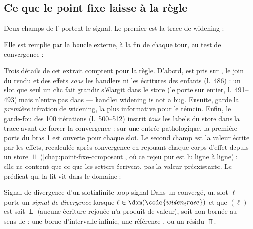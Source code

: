 \subsection{Ce que le point fixe laisse à la règle}
\label{sec:infinite-loop-signal}

Deux champs de l' portent le signal. Le premier est la trace de widening :


Elle est remplie par la boucle externe, à la fin de chaque tour, au test de convergence :


Trois détails de cet extrait comptent pour la règle. D'abord,  est pris sur , le join du rendu et des effets \emph{sans} les handlers ni les écritures des enfants (l.~486) : un slot que seul un clic fait grandir s'élargit dans le store (le  porte sur  entier, l.~491--493) mais n'entre pas dans  --- \og handler widening is not a bug\fg. Ensuite,  garde la \emph{première} itération de widening, la plus informative pour le témoin. Enfin, le garde-fou des 100 itérations (l.~500--512) inscrit \emph{tous} les labels du store dans la trace avant de forcer la convergence : sur une entrée pathologique, la première porte du bras 1 est ouverte pour chaque slot. Le second champ est la valeur écrite par les effets, recalculée après convergence en rejouant chaque corps d'effet depuis un store $\Bot$ (\cref{chap:point-fixe-composant}, où ce rejeu \og pur\fg{} est lu ligne à ligne) : elle ne contient que ce que les setters écrivent, pas la valeur préexistante. Le prédicat qui la lit vit dans le domaine :


\begin{definition}{Signal de divergence d'un slot}{infinite-loop-signal}
Dans un  convergé, un slot $\ell$ porte un \emph{signal de divergence} lorsque $\ell \in \dom(\code{widen_trace})$ et que $(\ell)$ est soit $\Bot$ (aucune écriture rejouée n'a produit de valeur), soit non bornée au sens de  : une borne d'intervalle infinie, une référence , ou un résidu $\Top$.
\end{definition}

